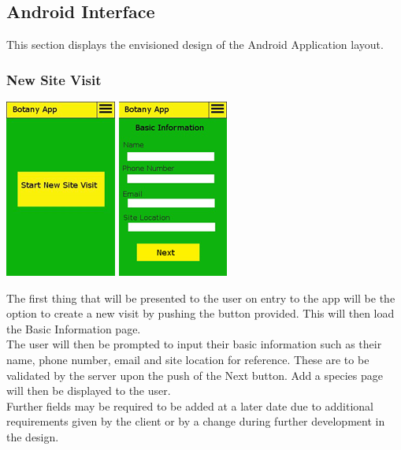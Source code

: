 \subsection{Android Interface}
	This section displays the envisioned design of the Android Application layout.

	\subsubsection{New Site Visit}
		\begin{center}
			\includegraphics[scale=1]{uiDesign/botanyAppNewSiteVisit1.png}
			\includegraphics[scale=1]{uiDesign/botanyAppNewSiteVisit2.png}
		\end{center}
	
		The first thing that will be presented to the user on entry to the app will be the option to create a new visit by pushing the button provided. This will then load the Basic Information page.\\

		The user will then be prompted to input their basic information such as their name, phone number, email and site location for reference. These are to be validated by the server upon the push of the Next button. Add a species page will then be displayed to the user.\\
	
		Further fields may be required to be added at a later date due to additional requirements given by the client or by a change during further development in the design.\\
	
